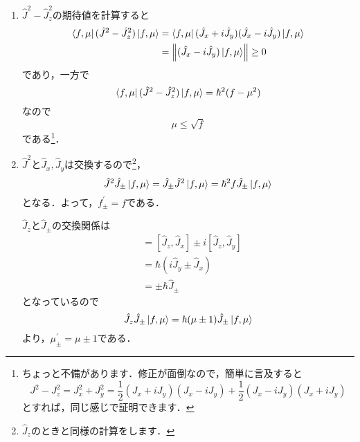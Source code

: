 \documentclass[a4paper,pdflatex,ja=standard]{bxjsarticle}
\begin{document}
\begin{enumerate}
  \item 
  $\hat{J}^2-\hat{J}_{z}^2$の期待値を計算すると
  \begin{align}
    \bra{f,\mu}
    (\hat{J}^2-\hat{J}_{z}^2)
    \ket{f,\mu}
    &=
    \bra{f,\mu}
    (\hat{J}_{x}+i\hat{J}_{y})
    (\hat{J}_{x}-i\hat{J}_{y})
    \ket{f,\mu}
    \nonumber
    \\
    &=
    \left\|
      (\hat{J}_{x}-i\hat{J}_{y})
      \ket{f,\mu}
    \right\|
    \geq
    0
  \end{align}
  であり，一方で
  \begin{equation}
    \bra{f,\mu}
    (\hat{J}^2-\hat{J}_{z}^2)
    \ket{f,\mu}
    =
    \hbar^2(f-\mu^2)
  \end{equation}
  なので
  \begin{equation}
    \mu\leq\sqrt{f}
  \end{equation}
  である\footnote{
    ちょっと不備があります．修正が面倒なので，簡単に言及すると
    $$
      J^2-J_z^2
      =
      J_x^2+J_y^2
      =
      \frac{1}{2}(J_x+iJ_y)(J_x-iJ_y)
      +
      \frac{1}{2}(J_x-iJ_y)(J_x+iJ_y)
    $$
    とすれば，同じ感じで証明できます．
  }．

  \item 
  $\hat{J}^2$と$\hat{J}_{x},\hat{J}_{y}$は交換するので\footnote{
    $\hat{J}_{z}$のときと同様の計算をします．
  }，
  \begin{equation}
    \hat{J}^2\hat{J}_{\pm}\ket{f,\mu}
    =
    \hat{J}_{\pm}\hat{J}^2\ket{f,\mu}
    =
    \hbar^2f\hat{J}_{\pm}\ket{f,\mu}
  \end{equation}
  となる．よって，$f_{\pm}^{\prime}=f$である．

  $\hat{J}_{z}$と$\hat{J}_{\pm}$の交換関係は
  \begin{align}
    [ \hat{J}_{z},\hat{J}_{\pm} ]
    &=
    [ \hat{J}_{z},\hat{J}_{x} ]
    \pm i
    [ \hat{J}_{z},\hat{J}_{y} ]
    \nonumber
    \\
    &=
    \hbar(i\hat{J}_{y}\pm\hat{J}_{x})
    \nonumber
    \\
    &=
    \pm\hbar\hat{J}_{\pm}
  \end{align}
  となっているので
  \begin{equation}
    \hat{J}_{z}\hat{J}_{\pm}\ket{f,\mu}
    =
    \hbar(\mu\pm1)\hat{J}_{\pm}\ket{f,\mu}
  \end{equation}
  より，$\mu_{\pm}^{\prime}=\mu\pm1$である．


\end{enumerate}
\end{document}
